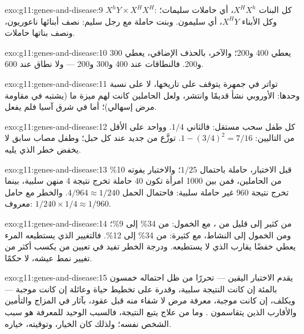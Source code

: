 \begin{solution}{exo:g11:genes-and-disease:9}
$X^hY \times X^HX^H$: كل البنات $X^HX^h$، أي حاملات سليمات؛ وكل
الأبناء $X^HY$، أي سليمون. وبنت حاملة مع رجل سليم: نصف أبنائها
ناعوريون، ونصف بناتها حاملات.
\end{solution}

\begin{solution}{exo:g11:genes-and-disease:10}
 يعطي 400 و200؛ والآخر، بالحذف الإضافي، يعطي 300 و200. فالنطاقات
عند 400 و300 و200 --- ولا نطاق عند 600.
\end{solution}

\begin{solution}{exo:g11:genes-and-disease:11}
تواتر  في جمهرة يتوقف على تاريخها، لا على نسبة  وحدها:
 الأوروبي نشأ قديمًا وانتشر، ولعل الحاملين كانت لهم ميزة ما
(يشتبه في مقاومة مرض إسهالي)؛ أما في شرق آسيا فلم يفعل.
\end{solution}

\begin{solution}{exo:g11:genes-and-disease:12}
كل طفل سحب مستقل: فالثاني $1/4$. وواحد على الأقل من التاليين:
$1 - (3/4)^2 = 7/16$.  توزَّع من جديد عند كل حبل؛ وطفل مصاب
سابق لا يخفض خطر الذي يليه.
\end{solution}

\begin{solution}{exo:g11:genes-and-disease:13}
قبل الاختبار، حاملة باحتمال $1/25$؛ والاختبار يفوته 10\% من الحاملين،
فمن بين 1000 امرأة تكون 40 حاملة تخرج نتيجة 4 منهن سلبية، بينما تخرج
نتيجة 960 غير حاملة سلبية: فاحتمال الحمل $4/964 \approx 1/240$. والخطر
مع حامل معروف: $1/240 \times 1/4
\approx 1/960$.
\end{solution}

\begin{solution}{exo:g11:genes-and-disease:14}
من كثير إلى قليل من ، مع الخمول: من 34\% إلى 9\%؛ ومن الخمول
إلى النشاط، مع  كثيرة: من 34\% إلى 12\%. فالتغيير الذي يستطيعه
المرء يعطي خفضًا يقارب الذي لا يستطيعه. ودرجة الخطر تفيد في تعيين من
يكسب أكثر من تغيير نمط عيشه، لا حكمًا.
\end{solution}

\begin{solution}{exo:g11:genes-and-disease:15}
يقدم الاختبار اليقين --- تحررًا من ظل احتماله خمسون بالمئة إن كانت
النتيجة سلبية، وقدرة على تخطيط حياة وعائلة إن كانت موجبة --- ويكلف، إن
كانت موجبة، معرفة مرض لا شفاء منه قبل عقود، بآثار في المزاج والتأمين
والأقارب الذين يتقاسمون . وما من علاج يتبع النتيجة، فالسبب
الوحيد للمعرفة هو سبب الشخص نفسه؛ ولذلك كان الخيار، وتوقيته، خياره.
\end{solution}

